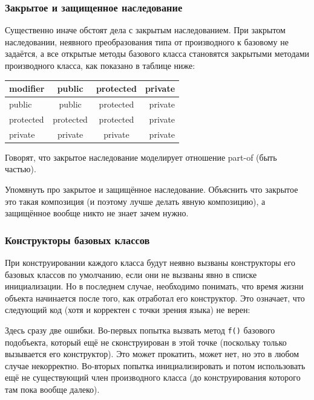\documentclass[a4paper,12pt,oneside]{article}
\begin{document}
\subsubsection{Закрытое и защищенное наследование}\label{OtherInheritance}

Существенно иначе обстоят дела с закрытым наследованием. При закрытом наследовании, неявного преобразования типа от производного к базовому не задаётся, а все открытые методы базового класса становятся закрытыми методами производного класса, как показано в таблице ниже:

\begin{center}
  \begin{tabular}{ | l | c | c | r | }
    \hline
    modifier & public & protected & private \\ \hline \hline
    public & public & protected & private \\ \hline
    protected & protected & protected & private \\ \hline
    private & private & private & private \\ \hline
  \end{tabular}
\end{center}

Говорят, что закрытое наследование моделирует отношение part-of (быть частью).


Упомянуть про закрытое и защищённое наследование. Объяснить что закрытое это такая композиция (и поэтому лучше делать явную композицию), а защищённое вообще никто не знает зачем нужно.

\subsubsection{Конструкторы базовых классов}

При конструировании каждого класса будут неявно вызваны конструкторы его базовых классов по умолчанию, если они не вызваны явно в списке инициализации. Но в последнем случае, необходимо понимать, что время жизни объекта начинается после того, как отработал его конструктор. Это означает, что следующий код (хотя и корректен с точки зрения языка) не верен:



Здесь сразу две ошибки. Во-первых попытка вызвать метод \lstinline!f()! базового подобъекта, который ещё не сконструирован в этой точке (поскольку только вызывается его конструктор). Это может прокатить, может нет, но это в любом случае некорректно. Во-вторых попытка инициализировать и потом использовать ещё не существующий член производного класса (до конструирования которого там пока вообще далеко).
\end{document}

